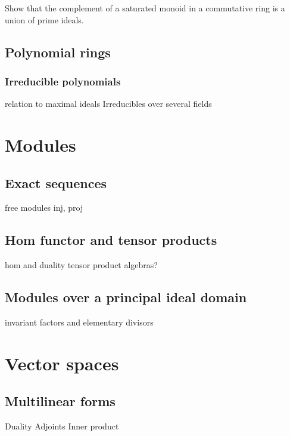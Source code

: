 \documentclass{../note}
\begin{document}
\begin{prb}
Show that the complement of a saturated monoid in a commutative ring is a union of prime ideals.
\end{prb}


\chapter{Polynomial rings}
\section{Irreducible polynomials}
relation to maximal ideals
Irreducibles over several fields













\part{Modules}

\chapter{Exact sequences}
free modules
inj, proj

\chapter{Hom functor and tensor products}
hom and duality
tensor product
algebras?

\chapter{Modules over a principal ideal domain}
invariant factors and elementary divisors

















\part{Vector spaces}


\chapter{Multilinear forms}
Duality
Adjoints
Inner product
\end{document}
